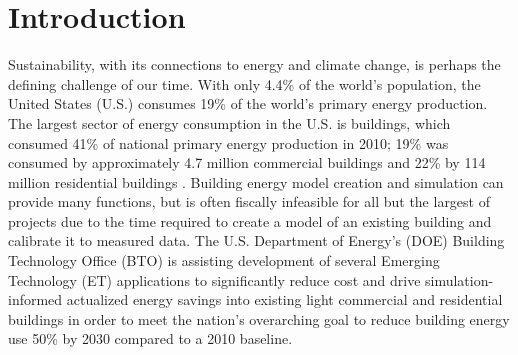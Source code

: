 \documentclass[preprint, review, 12pt]{elsarticle}
\begin{document}
\section{Introduction}
\label{sec:introduction}
Sustainability, with its connections to energy and climate change, is perhaps the defining challenge of our time. With only 4.4\% of the world's population, the United States (U.S.) consumes 19\% of the world's primary energy production. The largest sector of energy consumption in the U.S. is buildings, which consumed 41\% of national primary energy production in 2010; 19\% was consumed by approximately 4.7 million commercial buildings and 22\% by 114 million residential buildings \cite{cit:doe2012a}. Building energy model creation and simulation can provide many functions, but is often fiscally infeasible for all but the largest of projects due to the time required to create a model of an existing building and calibrate it to measured data. The U.S. Department of Energy's (DOE) Building Technology Office (BTO) is assisting development of several Emerging Technology (ET) applications to significantly reduce cost and drive simulation-informed actualized energy savings into existing light commercial and residential buildings in order to meet the nation’s overarching goal to reduce building energy use 50\% by 2030 compared to a 2010 baseline.
\end{document}
